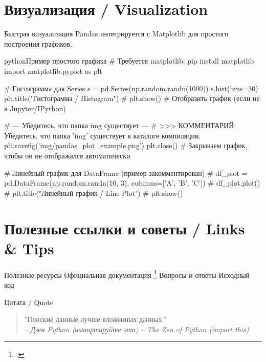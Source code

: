 \section{Визуализация / Visualization}
\begin{textbox}{Быстрая визуализация}
Pandas интегрируется с Matplotlib для простого построения графиков.

\begin{codebox}{python}{Пример простого графика}
# Требуется matplotlib: pip install matplotlib
import matplotlib.pyplot as plt

# Гистограмма для Series
s = pd.Series(np.random.randn(1000))
s.hist(bins=30)
plt.title("Гистограмма / Histogram")
# plt.show() # Отобразить график (если не в Jupyter/IPython)

# --- Убедитесь, что папка img существует ---
# >>> КОММЕНТАРИЙ: Убедитесь, что папка 'img' существует в каталоге компиляции.
plt.savefig('img/pandas_plot_example.png')
plt.close() # Закрываем график, чтобы он не отображался автоматически

# Линейный график для DataFrame (пример закомментирован)
# df_plot = pd.DataFrame(np.random.randn(10, 3), columns=['A', 'B', 'C'])
# df_plot.plot()
# plt.title("Линейный график / Line Plot")
# plt.show()
\end{codebox}

\end{textbox}

\section{Полезные ссылки и советы / Links \& Tips}
\begin{myblock}{Полезные ресурсы}
 {Официальная документация \footcite{pandas_documentation}}
 {Вопросы и ответы}
 {Исходный код}
\end{myblock}

\begin{textbox}{Цитата / Quote}
\begin{quote}
"Плоские данные лучше вложенных данных." \\
\emph{-- Дзен Python (импортируйте это)}
\emph{-- The Zen of Python (import this)}
\end{quote}
\end{textbox}

